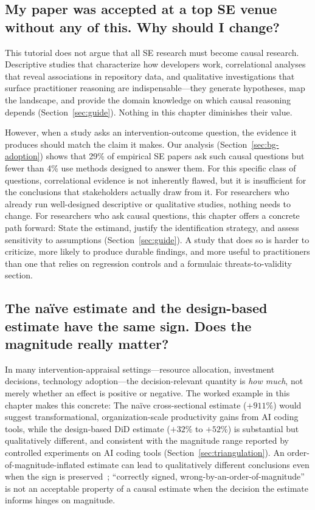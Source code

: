 \subsection{My paper was accepted at a top SE venue without any of this. Why should I change?}

This tutorial does not argue that all SE research must become causal research.
Descriptive studies that characterize how developers work, correlational analyses that reveal associations in repository data, and qualitative investigations that surface practitioner reasoning are indispensable---they generate hypotheses, map the landscape, and provide the domain knowledge on which causal reasoning depends (Section~\ref{sec:guide}).
Nothing in this chapter diminishes their value.

However, when a study asks an intervention-outcome question, the evidence it produces should match the claim it makes.
Our analysis (Section~\ref{sec:bg-adoption}) shows that 29\% of empirical SE papers ask such causal questions but fewer than 4\% use methods designed to answer them.
For this specific class of questions, correlational evidence is not inherently flawed, but it is insufficient for the conclusions that stakeholders actually draw from it.
For researchers who already run well-designed descriptive or qualitative studies, nothing needs to change.
For researchers who ask causal questions, this chapter offers a concrete path forward: State the estimand, justify the identification strategy, and assess sensitivity to assumptions (Section~\ref{sec:guide}).
A study that does so is harder to criticize, more likely to produce durable findings, and more useful to practitioners than one that relies on regression controls and a formulaic threats-to-validity section.

\subsection{The na\"ive estimate and the design-based estimate have the same sign. Does the magnitude really matter?}

In many intervention-appraisal settings---resource allocation, investment decisions, technology adoption---the decision-relevant quantity is \emph{how much}, not merely whether an effect is positive or negative.
The worked example in this chapter makes this concrete: The na\"ive cross-sectional estimate ($+911\%$) would suggest transformational, organization-scale productivity gains from AI coding tools, while the design-based DiD estimate ($+32\%$ to $+52\%$) is substantial but qualitatively different, and consistent with the magnitude range reported by controlled experiments on AI coding tools (Section~\ref{sec:triangulation}).
An order-of-magnitude-inflated estimate can lead to qualitatively different conclusions even when the sign is preserved~\cite{lundberg2021estimand}; ``correctly signed, wrong-by-an-order-of-magnitude'' is not an acceptable property of a causal estimate when the decision the estimate informs hinges on magnitude.


